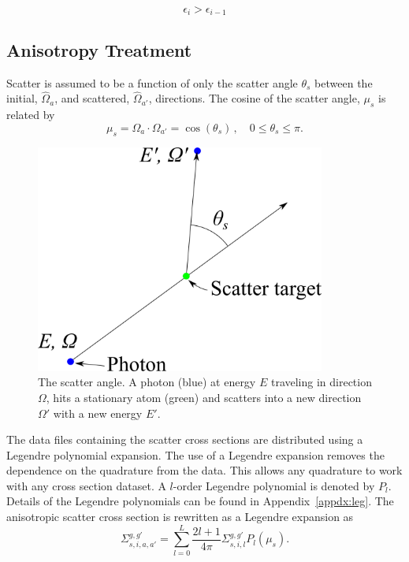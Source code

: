 \begin{equation}\label{eq:conv4}
\epsilon_i > \epsilon_{i-1}
\end{equation}

\subsection{Anisotropy Treatment}

Scatter is assumed to be a function of only the scatter angle $\theta_s$ between the initial, $\hat{\Omega}_a$, and scattered, $\hat{\Omega}_{a'}$, directions. The cosine of the scatter angle, $\mu_s$ is related by 
\begin{equation} \label{eq:scat_cos}
\mu_s = \Omega_a \cdot \Omega_{a'} = \cos(\theta_s) \,, \quad 0 \leq \theta_s \leq \pi.
\end{equation}

\begin{figure}[tb]
  \begin{center}
   \includegraphics[width=3.75in]{figs/scat_ang}
  \end{center}
  \caption{The scatter angle. A photon (blue) at energy $E$ traveling in direction $\Omega$, hits a stationary atom (green) and scatters into a new direction $\Omega'$ with a new energy $E'$.}
\label{fig:scat_ang}
\end{figure}%

The data files containing the scatter cross sections are distributed using a Legendre polynomial expansion. The use of a Legendre expansion removes the dependence on the quadrature from the data. This allows any quadrature to work with any cross section dataset. A $l$-order Legendre polynomial is denoted by $P_l$. Details of the Legendre polynomials can be found in Appendix~\ref{appdx:leg}. The anisotropic scatter cross section is rewritten as a Legendre expansion as
\begin{equation} \label{eq:leg_1}
\Sigma_{s, i, a, a'}^{g, g'} = \sum_{l=0}^L \frac{2l+1}{4 \pi}\Sigma_{s, i, l}^{g, g'} P_l(\mu_s).
\end{equation}

